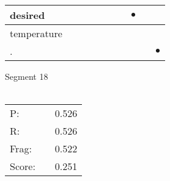 \documentclass[landscape]{article}
\newcommand{\ssp}{\hspace{2pt}}
\newcommand{\mex}{\cellcolor{g}$\bullet$}
\begin{document}
\begin{tabular}{|l|p{10pt}|p{10pt}|p{10pt}|p{10pt}|p{10pt}|p{10pt}|p{10pt}|p{10pt}|p{10pt}|}
\hline
\ssp \cellcolor{ref6}desired \ssp&\hspace{2pt}&\hspace{2pt}&\hspace{2pt}&\hspace{2pt}&\hspace{2pt}&\hspace{2pt}&\hspace{2pt}\mex&\hspace{2pt}&\hspace{2pt}\\
\hline
\ssp temperature \ssp&\hspace{2pt}&\hspace{2pt}&\hspace{2pt}&\hspace{2pt}&\hspace{2pt}&\hspace{2pt}&\hspace{2pt}&\hspace{2pt}&\hspace{2pt}\\
\hline
\ssp \cellcolor{ref8}. \ssp&\hspace{2pt}&\hspace{2pt}&\hspace{2pt}&\hspace{2pt}&\hspace{2pt}&\hspace{2pt}&\hspace{2pt}&\hspace{2pt}&\hspace{2pt}\mex\\
\hline
\end{tabular}

\vspace{6pt}
\noindent Segment 18\\\\
\noindent\begin{tabular}{lm{12pt}r}
\hline
P:&&0.526\\
R:&&0.526\\
Frag:&&0.522\\
Score:&&0.251\\
\end{tabular}

\newpage
\end{document}
